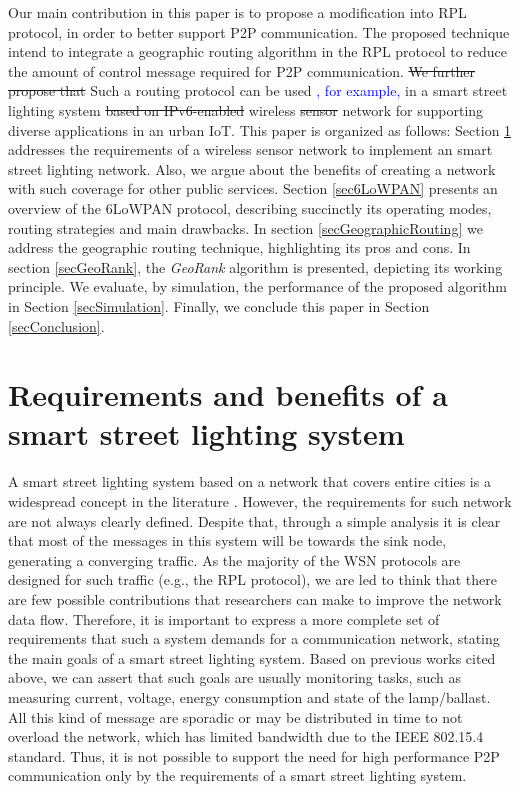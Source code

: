 \documentclass[final,authoryear,3p,twocolumn]{elsarticle}
\newcommand{\rev}{\textcolor{blue}}
\begin{document}
Our main contribution in this paper is to propose a modification into RPL protocol, in order to better support P2P communication. The proposed technique intend to integrate a geographic routing algorithm in the RPL protocol to reduce the amount of control message required for P2P communication. \sout{We further propose that} Such a routing protocol can be used \rev{, for example,} in a smart street lighting system \sout{based on IPv6-enabled} wireless \sout{sensor} network for supporting diverse applications in an urban IoT. This paper is organized as follows: Section \ref{secRequirements} addresses the requirements of a wireless sensor network to implement an smart street lighting network. Also, we argue about the benefits of creating a network with such coverage for other public services. Section \ref{sec6LoWPAN} presents an overview of the 6LoWPAN protocol, describing succinctly its operating modes, routing strategies and main drawbacks. In section \ref{secGeographicRouting} we address the geographic routing technique, highlighting its pros and cons. In section \ref{secGeoRank}, the \textit{GeoRank} algorithm is presented, depicting its working principle. We evaluate, by simulation, the performance of the proposed algorithm in Section \ref{secSimulation}. Finally, we conclude this paper in Section \ref{secConclusion}.


\section{Requirements and benefits of a smart street lighting system}
\label{secRequirements}
A smart street lighting system based on a network that covers entire cities is a widespread concept in the literature \citep{Our_IAS_2009, WSN_Street_Lighting_2010_1, Cellular_Street_Lighting_2010_1, WSN_Street_Lighting_2010_2,Pantoni_2011, Pantoni_2013, daFonseca_2015}. However, the requirements for such network are not always clearly defined. Despite that, through a simple analysis it is clear that most of the messages in this system will be towards the sink node, generating a converging traffic. As the majority of the WSN protocols are designed for such traffic (e.g., the RPL protocol), we are led to think that there are few possible contributions that researchers can make to improve the network data flow. Therefore, it is important to express a more complete set of requirements that such a system demands for a communication network, stating the main goals of a smart street lighting system. Based on previous works cited above, we can assert that such goals are usually monitoring tasks, such as measuring current, voltage, energy consumption and state of the lamp/ballast. All this kind of message are sporadic or may be distributed in time to not overload the network, which has limited bandwidth due to the IEEE 802.15.4 standard. Thus, it is not possible to support the need for high performance P2P communication only by the requirements of a smart street lighting system.
\end{document}
